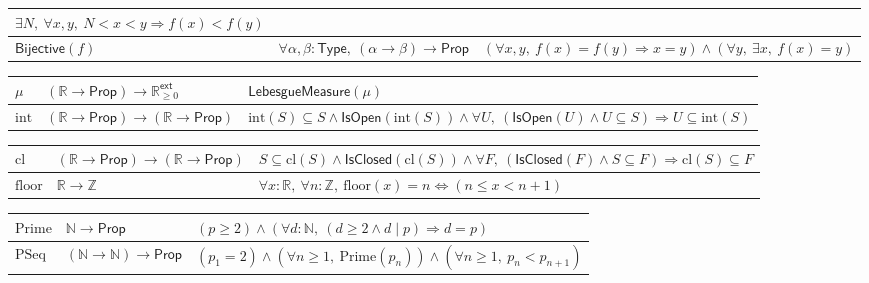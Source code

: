 \documentclass[11pt,reqno]{amsart}
\theoremstyle{blueplain}
\numberwithin{equation}{section}
\begin{document}
{\begin{tabular}{|m{4cm}|m{5cm}|m{9cm}|}
		$\exists N,\ \forall x,y,\ N<x<y\Rightarrow f(x)<f(y)$ \\ 
		\hline
		$\mathsf{Bijective}(f)$ & $\forall\alpha,\beta:\mathsf{Type},\ (\alpha\to\beta)\to\mathsf{Prop}$ &
		$(\forall x,y,\ f(x)=f(y)\Rightarrow x=y)\wedge(\forall y,\ \exists x,\ f(x)=y)$ \\ 
	\end{tabular}%
	\noindent \newline
	\noindent 
	\begin{tabular}{|m{4cm}|m{5cm}|m{9cm}|}
		\hline
		$\mu$ & $(\mathbb{R}\to\mathsf{Prop})\to\mathbb{R}_{\ge 0}^{\mathsf{ext}}$ &
		$\mathsf{LebesgueMeasure}(\mu)$ \\ \hline
		$\mathrm{int}$ & $(\mathbb{R}\to\mathsf{Prop})\to(\mathbb{R}\to\mathsf{Prop})$ &
		$\mathrm{int}(S)\subseteq S\wedge\mathsf{IsOpen}(\mathrm{int}(S))
		\wedge\forall U,\ (\mathsf{IsOpen}(U)\wedge U\subseteq S)\Rightarrow
		U\subseteq\mathrm{int}(S)$ \\
	\end{tabular}
	\noindent \newline
	\noindent
	\begin{tabular}{|m{4cm}|m{5cm}|m{9cm}|}
		\hline
		$\mathrm{cl}$ & $(\mathbb{R}\to\mathsf{Prop})\to(\mathbb{R}\to\mathsf{Prop})$ &
		$S\subseteq\mathrm{cl}(S)\wedge\mathsf{IsClosed}(\mathrm{cl}(S))
		\wedge\forall F,\ (\mathsf{IsClosed}(F)\wedge S\subseteq F)\Rightarrow
		\mathrm{cl}(S)\subseteq F$ \\ \hline
		$\mathrm{floor}$ & $\mathbb{R}\to\mathbb{Z}$ &
		$\forall x:\mathbb{R},\ \forall n:\mathbb{Z},\ \mathrm{floor}(x)=n
		\iff(n\leq x<n+1)$ \\ 
	\end{tabular}%
	\noindent \newline
	\noindent
	\begin{tabular}{|m{4cm}|m{5cm}|m{9cm}|}
		\hline
		$\mathrm{Prime}$ & $\mathbb{N}\to\mathsf{Prop}$ &
		$(p\geq 2)\wedge(\forall d:\mathbb{N},\ (d\geq 2\wedge d\mid p)
		\Rightarrow d=p)$ \\ \hline
		$\mathrm{PSeq}$ & $(\mathbb{N}\to\mathbb{N})\to\mathsf{Prop}$ &
		$(p_1=2)\wedge(\forall n\geq 1,\ \mathrm{Prime}(p_n))
		\wedge(\forall n\geq 1,\ p_n<p_{n+1})$ \\ 
	\end{tabular}%
	\noindent \newline
	\noindent
	\begin{tabular}{|m{4cm}|m{5cm}|m{9cm}|}

\end{tabular}}
\end{document}
